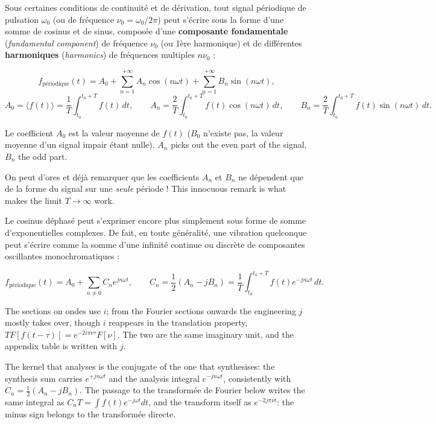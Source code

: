 Sous certaines conditions de continuité et de dérivation, tout signal périodique
de pulsation $\omega_0$ (ou de fréquence $\nu_0=\omega_0/2\pi$) peut s'écrire
sous la forme d'une somme de cosinus et de sinus, composée d'une
\textbf{composante fondamentale} (\textit{fundamental component}) de fréquence
$\nu_0$ (ou 1ère harmonique) et de différentes \textbf{harmoniques}
(\textit{harmonics}) de fréquences multiples $n\nu_0$ :

\[
  f_{\text{périodique}}(t)=A_0+\sum_{n=1}^{+\infty}A_n\cos(n\omega t)
    +\sum_{n=1}^{+\infty}B_n\sin(n\omega t),
\]
\[
  A_0=\langle f(t)\rangle=\frac{1}{T}\int_{t_0}^{t_0+T}f(t)\,dt,
  \qquad
  A_n=\frac{2}{T}\int_{t_0}^{t_0+T}f(t)\cos(n\omega t)\,dt,
  \qquad
  B_n=\frac{2}{T}\int_{t_0}^{t_0+T}f(t)\sin(n\omega t)\,dt .
\]

Le coefficient $A_0$ est la valeur moyenne de $f(t)$ ($B_0$ n'existe pas, la
valeur moyenne d'un signal impair étant nulle). $A_n$ picks out the even part of
the signal, $B_n$ the odd part.

\begin{remark}
  On peut d'ores et déjà remarquer que les coefficients $A_n$ et $B_n$ ne
  dépendent que de la forme du signal sur une \emph{seule} période ! This
  innocuous remark is what makes the limit $T\to\infty$ work.
\end{remark}

Le cosinus déphasé peut s'exprimer encore plus simplement sous forme de somme
d'exponentielles complexes. De fait, en toute généralité, une vibration
quelconque peut s'écrire comme la somme d'une infinité continue ou discrète de
composantes oscillantes monochromatiques :

\[
  f_{\text{périodique}}(t)=A_0+\sum_{n\neq 0}C_ne^{jn\omega t},
  \qquad
  C_n=\frac{1}{2}\left(A_n-jB_n\right)=\frac{1}{T}\int_{t_0}^{t_0+T}f(t)e^{-jn\omega t}\,dt .
\]

\begin{notation}[$i$ or $j$]
  The sections on ondes use $i$; from the Fourier sections onwards the
  engineering $j$ mostly takes over, though $i$ reappears in the translation
  property, $TF[f(t-\tau)]=e^{-2i\pi\nu\tau}F[\nu]$. The two are the same
  imaginary unit, and the appendix table is written with $j$.
\end{notation}

\begin{remark}
  The kernel that analyses is the conjugate of the one that synthesises: the
  synthesis sum carries $e^{+jn\omega t}$ and the analysis integral
  $e^{-jn\omega t}$, consistently with $C_n=\frac{1}{2}(A_n-jB_n)$. The passage
  to the transformée de Fourier below writes the same integral as
  $C_nT=\int f(t)e^{-j\omega t}dt$, and the transform itself as
  $e^{-2j\pi\nu t}$: the minus sign belongs to the transformée directe.
\end{remark}

